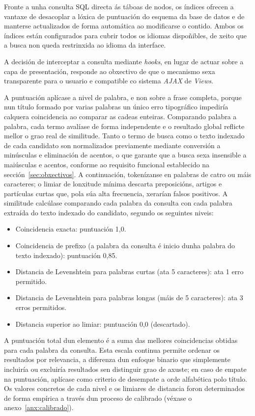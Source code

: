 \documentclass[%
    a4paper,               %
    twoside,               %
    10pt,                  %
]{article}                 %
\begin{document}
Fronte a unha consulta SQL directa ás táboas de nodos, os índices ofrecen a vantaxe de desacoplar a lóxica de puntuación do esquema da base de datos e de manterse actualizados de forma automática ao modificarse o contido. Ambos os índices están configurados para cubrir todos os idiomas dispoñibles, de xeito que a busca non queda restrinxida ao idioma da interface.

A decisión de interceptar a consulta mediante \textit{hooks}, en lugar de actuar sobre a capa de presentación, responde ao obxectivo de que o mecanismo sexa transparente para o usuario e compatible co sistema \textit{AJAX} de \textit{Views}.

A puntuación aplícase a nivel de palabra, e non sobre a frase completa, porque nun título formado por varias palabras un único erro tipográfico impediría calquera coincidencia ao comparar as cadeas enteiras. Comparando palabra a palabra, cada termo avalíase de forma independente e o resultado global reflicte mellor o grao real de similitude. Tanto o termo de busca como o texto indexado de cada candidato son normalizados previamente mediante conversión a minúsculas e eliminación de acentos, o que garante que a busca sexa insensible a maiúsculas e acentos, conforme ao requisito funcional establecido na sección~\ref{sec:obxectivos}. A continuación, tokenízanse en palabras de catro ou máis caracteres; o limiar de lonxitude mínima descarta preposicións, artigos e partículas curtas que, pola súa alta frecuencia, xerarían falsos positivos. A similitude calcúlase comparando cada palabra da consulta con cada palabra extraída do texto indexado do candidato, segundo os seguintes niveis:

\begin{itemize}
    \item Coincidencia exacta: puntuación 1,0.
    \item Coincidencia de prefixo (a palabra da consulta é inicio dunha palabra do texto indexado): puntuación 0,85.
    \item Distancia de Levenshtein para palabras curtas (ata 5 caracteres): ata 1 erro permitido.
    \item Distancia de Levenshtein para palabras longas (máis de 5 caracteres): ata 3 erros permitidos.
    \item Distancia superior ao limiar: puntuación 0,0 (descartado).
\end{itemize}

A puntuación total dun elemento é a suma das mellores coincidencias obtidas para cada palabra da consulta. Esta escala continua permite ordenar os resultados por relevancia, a diferenza dun enfoque binario que simplemente incluiría ou excluiría resultados sen distinguir grao de axuste; en caso de empate na puntuación, aplícase como criterio de desempate a orde alfabética polo título. Os valores concretos de cada nivel e os limiares de distancia foron determinados de forma empírica a través dun proceso de calibrado (véxase o anexo~\ref{anx:calibrado}).
\end{document}
